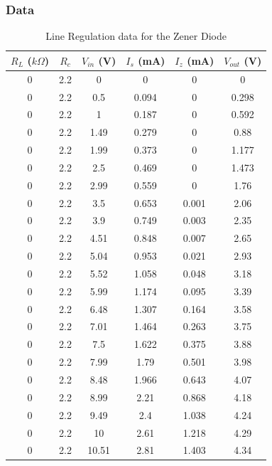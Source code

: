 \documentclass[10pt]{scrartcl}
\theoremstyle{definition}
\begin{document}
\subsubsection{Data}
\begin{table}[!ht]
    \centering
    \caption{Line Regulation data for the Zener Diode}
    \begin{tabular}{|c|c|c|c|c|c|}
    \hline
        \textbf{$R_L$ ($k\Omega$)} & \textbf{$R_c$} & \textbf{$V_{in}$ (V)} & \textbf{$I_s$ (mA)} & \textbf{$I_z$ (mA)} & \textbf{$V_{out}$ (V)} \\ \hline
        0 & 2.2 & 0 & 0 & 0 & 0 \\ \hline
        0 & 2.2 & 0.5 & 0.094 & 0 & 0.298 \\ \hline
        0 & 2.2 & 1 & 0.187 & 0 & 0.592 \\ \hline
        0 & 2.2 & 1.49 & 0.279 & 0 & 0.88 \\ \hline
        0 & 2.2 & 1.99 & 0.373 & 0 & 1.177 \\ \hline
        0 & 2.2 & 2.5 & 0.469 & 0 & 1.473 \\ \hline
        0 & 2.2 & 2.99 & 0.559 & 0 & 1.76 \\ \hline
        0 & 2.2 & 3.5 & 0.653 & 0.001 & 2.06 \\ \hline
        0 & 2.2 & 3.9 & 0.749 & 0.003 & 2.35 \\ \hline
        0 & 2.2 & 4.51 & 0.848 & 0.007 & 2.65 \\ \hline
        0 & 2.2 & 5.04 & 0.953 & 0.021 & 2.93 \\ \hline
        0 & 2.2 & 5.52 & 1.058 & 0.048 & 3.18 \\ \hline
        0 & 2.2 & 5.99 & 1.174 & 0.095 & 3.39 \\ \hline
        0 & 2.2 & 6.48 & 1.307 & 0.164 & 3.58 \\ \hline
        0 & 2.2 & 7.01 & 1.464 & 0.263 & 3.75 \\ \hline
        0 & 2.2 & 7.5 & 1.622 & 0.375 & 3.88 \\ \hline
        0 & 2.2 & 7.99 & 1.79 & 0.501 & 3.98 \\ \hline
        0 & 2.2 & 8.48 & 1.966 & 0.643 & 4.07 \\ \hline
        0 & 2.2 & 8.99 & 2.21 & 0.868 & 4.18 \\ \hline
        0 & 2.2 & 9.49 & 2.4 & 1.038 & 4.24 \\ \hline
        0 & 2.2 & 10 & 2.61 & 1.218 & 4.29 \\ \hline
        0 & 2.2 & 10.51 & 2.81 & 1.403 & 4.34 \\ \hline

\end{tabular}
\end{table}
\end{document}
